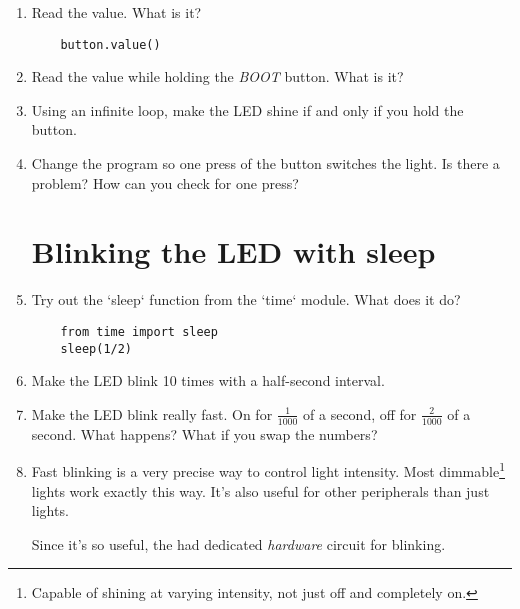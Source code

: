 \documentclass{../tutorial}
\begin{document}
\begin{enumerate}
\item
    Read the value. What is it?

    \begin{lstlisting}
    button.value()
    \end{lstlisting}

\item
    Read the value while holding the \emph{BOOT} button. What is it?

    \begin{comment}
        The \emph{BOOT} button is next to the USB connector.
        Don't confuse it with \emph{EN}!
    \end{comment}

\item
    Using an infinite loop, make the LED shine if and only if you hold the button.

\item
    Change the program so one press of the button switches the light.
    Is there a problem? How can you check for one press?

\section{Blinking the LED with sleep}

\item
    Try out the `sleep` function from the `time` module.
    What does it do?

    \begin{lstlisting}
    from time import sleep
    sleep(1/2)
    \end{lstlisting}

\item
    Make the LED blink 10 times with a half-second interval.

\item
    Make the LED blink really fast.
    On for $\frac{1}{1000}$ of a second, off for $\frac{2}{1000}$ of a second.
    What happens? What if you swap the numbers?

\item
    Fast blinking is a very precise way to control light intensity.
    Most dimmable\footnote{
        Capable of shining at varying intensity, not just off and completely on.
    } lights work exactly this way.
    It's also useful for other peripherals than just lights.

    Since it's so useful, the \ESP had dedicated \emph{hardware }
    circuit for blinking.


\end{enumerate}
\end{document}
